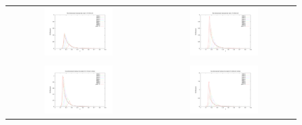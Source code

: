 \begin{figure}[h!]
\begin{tabular}{cc}
          \includegraphics[width=0.5\textwidth]{variance_ad_free_mesh_t5_v10.pdf} & \includegraphics[width=0.5\textwidth]{variance_ad_free_mesh_t5_v20.pdf}\\\\
  \includegraphics[width=0.5\textwidth]{variance_ad_free_mesh_t6_v10.pdf} & \includegraphics[width=0.5\textwidth]{variance_ad_free_mesh_t6_fine_v20.pdf}\\

\end{tabular}
\end{figure}
